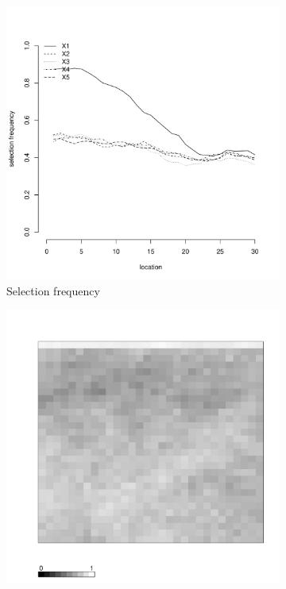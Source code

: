 \documentclass[authoryear, review, 11pt]{elsarticle}
\begin{document}
\begin{figure}
\begin{subfigure}[b]{0.45\textwidth}
		\includegraphics[width=\textwidth]{../../figures/simulation/15.16.profile_selection.pdf}
		\caption{Selection frequency}
	\end{subfigure}
	\begin{subfigure}[b]{0.45\textwidth}
	\centering
		\includegraphics[width=\textwidth]{../../figures/simulation/X1.15.16.unshrunk_bootstrap_coverage.pdf}

\end{subfigure}
\end{figure}
\end{document}
